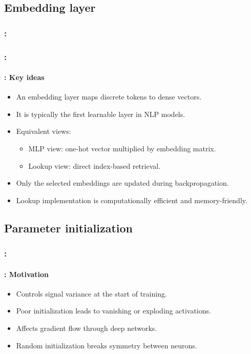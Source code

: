 \documentclass[xcolor=table]{beamer}
\begin{document}
\subsection{Embedding layer}

\begin{frame}
	\frametitle{\insertshortsubtitle: \insertsection}
	\framesubtitle{\insertsubsection}
	
	
\end{frame}

\begin{frame}
	\frametitle{\insertshortsubtitle: \insertsection}
	\framesubtitle{\insertsubsection: Key ideas}
	
	\begin{itemize}
		\item An embedding layer maps discrete tokens to dense vectors.
		\item It is typically the first learnable layer in NLP models.
		
		\item Equivalent views:
		\begin{itemize}
			\item MLP view: one-hot vector multiplied by embedding matrix.
			\item Lookup view: direct index-based retrieval.
		\end{itemize}
		
		\item Only the selected embeddings are updated during backpropagation.
		
		\item Lookup implementation is computationally efficient and memory-friendly.
	\end{itemize}
	
\end{frame}

\subsection{Parameter initialization}

\begin{frame}
	\frametitle{\insertshortsubtitle: \insertsection}
	\framesubtitle{\insertsubsection: Motivation}
	
	\begin{itemize}
		\item Controls signal variance at the start of training.
		\item Poor initialization leads to vanishing or exploding activations.
		\item Affects gradient flow through deep networks.
		\item Random initialization breaks symmetry between neurons.
	\end{itemize}
	
\end{frame}
\end{document}
